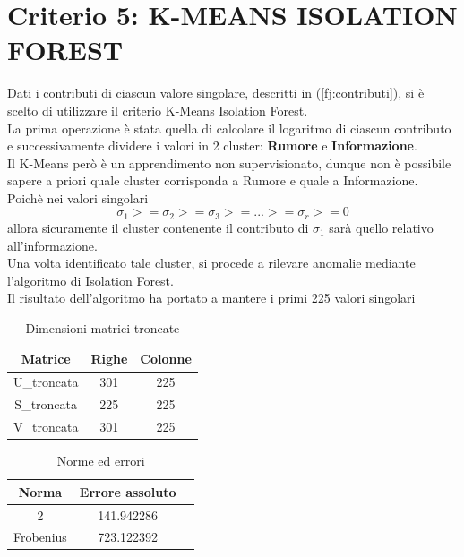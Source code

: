 \section{Criterio 5: K-MEANS ISOLATION FOREST}

Dati i contributi di ciascun valore singolare, descritti in (\ref{fj:contributi}), si è scelto di utilizzare il criterio K-Means Isolation Forest.\\
La prima operazione è stata quella di calcolare il logaritmo di ciascun contributo e successivamente dividere i valori in 2 cluster: \textbf{Rumore} e \textbf{Informazione}.\\
Il K-Means però è un apprendimento non supervisionato, dunque non è possibile sapere a priori quale cluster corrisponda a Rumore e quale a Informazione.\\
Poichè nei valori singolari
\begin{equation}
    \sigma_1 >= \sigma_2 >= \sigma_3 >= ... >= \sigma_r>=0
\end{equation}
allora sicuramente il cluster contenente il contributo di $\sigma_1$ sarà quello relativo all'informazione.\\
Una volta identificato tale cluster, si procede a rilevare anomalie mediante l'algoritmo di Isolation Forest.\\

\noindent Il risultato dell'algoritmo ha portato a mantere i primi 225 valori singolari
 \begin{table}[H]
    \centering
    \begin{tabular}{|c|c|c|}
        \hline
        \textbf{Matrice} & \textbf{Righe} & \textbf{Colonne} \\
        \hline
        U\_troncata & 301 & 225 \\
        \hline
        S\_troncata & 225 & 225 \\
        \hline
        V\_troncata & 301 & 225 \\
        \hline
    \end{tabular}
    \caption{Dimensioni matrici troncate}
\end{table}

\begin{table}[H]
    \centering
    \begin{tabular}{|c|c|c|}
        \hline
        \textbf{Norma} & \textbf{Errore assoluto} \\
        \hline
        2 & 141.942286  \\
        \hline
        Frobenius & 723.122392 \\
        \hline
    \end{tabular}
    \caption{Norme ed errori}
\end{table}

